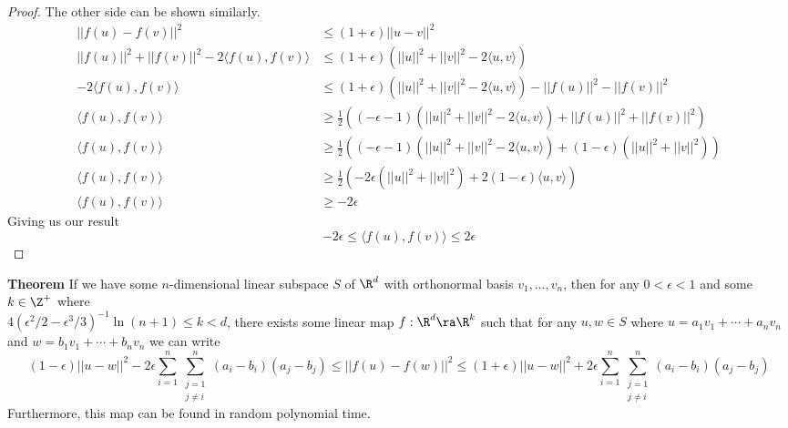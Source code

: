 \documentclass{article}
\newcommand{\innerproduct}[2]{\langle #1, #2 \rangle}
\begin{document}
\begin{proof}
    The other side can be shown similarly. 
    \begin{align*}
        ||f(u) - f(v)||^2 &\leq (1+ \epsilon)||u-v||^2 \\
        ||f(u)||^2 + ||f(v)||^2 - 2\innerproduct{f(u)}{f(v)} &\leq (1+\epsilon)(||u||^2+||v||^2-2\innerproduct{u}{v})  \\
        -2\innerproduct{f(u)}{f(v)} &\leq (1+\epsilon)(||u||^2+||v||^2-2\innerproduct{u}{v}) - ||f(u)||^2 - ||f(v)||^2 \\
        \innerproduct{f(u)}{f(v)} &\geq \frac{1}{2} ((-\epsilon - 1)(||u||^2+||v||^2-2\innerproduct{u}{v}) +||f(u)||^2 + ||f(v)||^2) \\
        \innerproduct{f(u)}{f(v)} &\geq \frac{1}{2} ((-\epsilon - 1)(||u||^2+||v||^2-2\innerproduct{u}{v}) + (1-\epsilon)(||u||^2 + ||v||^2)) \\
        \innerproduct{f(u)}{f(v)} &\geq \frac{1}{2} (-2\epsilon (||u||^2 + ||v||^2) + 2(1-\epsilon)\innerproduct{u}{v}) \\
        \innerproduct{f(u)}{f(v)} &\geq -2\epsilon
    \end{align*}
    Giving us our result
    \[-2\epsilon \leq \innerproduct{f(u)}{f(v)} \leq 2\epsilon\]
\end{proof}

\noindent\textbf{Theorem} If we have some $n$-dimensional linear subspace $S$ of $\R^d$ with 
orthonormal basis $v_1,\ldots,v_n$, then for any $0 < \epsilon < 1$ and some $k \in \Z^+$ where \\
$4(\epsilon^2 / 2 - \epsilon^3 / 3)^{-1}\ln{(n+1)} \leq k < d$,
there exists some linear map $f: \R^d \ra \R^k$ such that for any 
$u,w \in S$ where $u = a_1v_1 + \cdots + a_{n}v_n$ and $w = b_1v_1 + \cdots + b_{n}v_n$ we can write
\[(1-\epsilon)||u-w||^2- 2\epsilon\sum_{i=1}^{n}\sum_{\substack{j=1 \\ j \neq i}}^{n}(a_{i}-b_i)(a_{j}-b_j) \leq ||f(u) - f(w)||^2 \leq (1+\epsilon)||u-w||^2 + 2\epsilon\sum_{i=1}^{n}\sum_{\substack{j=1 \\ j \neq i}}^{n}(a_{i}-b_i)(a_{j}-b_j)\]
Furthermore, this map can be found in random polynomial time.
\end{document}
